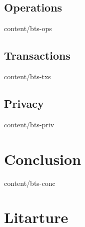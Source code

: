\documentclass[conference,final,10pt,a4paper]{IEEEtran}
\begin{document}
\subsection { Operations      }  { content/bts-ops        } 
\subsection { Transactions    }  { content/bts-txs        } 
\subsection { Privacy         }  { content/bts-priv       } 

\section    { Conclusion      }  { content/bts-conc       } 

\section*   { Litarture      } 
\end{document}
